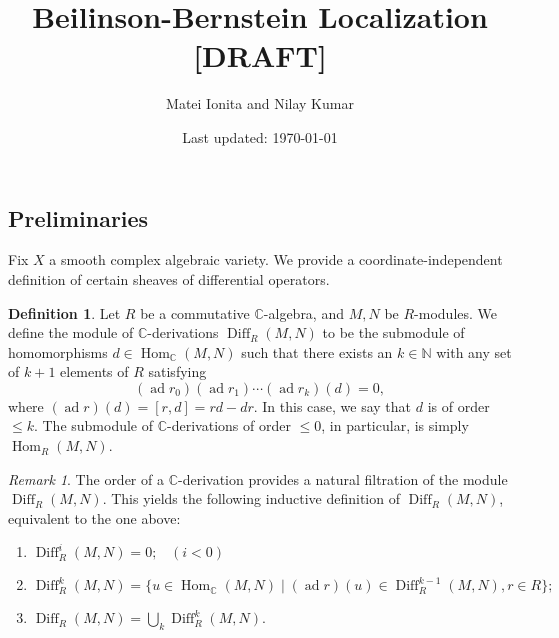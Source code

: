 \documentclass{article}
\newcommand{\C}{\mathbb{C}}
\newcommand{\N}{\mathbb{N}}
\theoremstyle{plain}
\theoremstyle{definition}
\newtheorem{definition}[theorem]{Definition}
\theoremstyle{remark}
\newtheorem*{remark}{Remark}
\DeclareMathOperator{\Hom}{Hom}
\DeclareMathOperator{\Diff}{Diff}
\DeclareMathOperator{\ad}{ad}
\begin{document}
\title{Beilinson-Bernstein Localization [DRAFT]}
\author{Matei Ionita and Nilay Kumar}
\date{Last updated: \today}

\maketitle

\subsection{Preliminaries}

Fix $X$ a smooth complex algebraic variety. We provide a coordinate-independent definition
of certain sheaves of differential operators.

\begin{definition}
    Let $R$ be a commutative $\C$-algebra, and $M,N$ be $R$-modules.
    We define the module of $\C$-derivations $\Diff_R(M,N)$ to be the submodule
    of homomorphisms $d\in\Hom_\C(M,N)$ such that there exists an $k\in\N$ with any set
    of $k+1$ elements of $R$ satisfying
    \[(\ad r_0)(\ad r_1)\cdots(\ad r_k)(d)=0,\]
    where $(\ad r)(d)=[r,d]=rd-dr$. In this case, we say that $d$ is of order $\leqslant k$.
    The submodule of $\C$-derivations of order $\leqslant 0$, in particular, is simply
    $\Hom_R(M,N)$.
    \label{def:derivations}
\end{definition}

\begin{remark}
    The order of a $\C$-derivation provides a natural filtration of the module $\Diff_R(M,N)$.
    This yields the following inductive definition of $\Diff_R(M,N)$, equivalent to the one
    above:
    \begin{enumerate}
        \item[] $\Diff^{i}_R(M,N) = 0; \;\;\;(i<0)$
        \item[] $\Diff^k_R(M,N) = \{u\in\Hom_\C(M,N)\mid (\ad r)(u)\in \Diff^{k-1}_R(M,N), r\in R\};$
        \item[] $\Diff_R(M,N)=\bigcup_k\Diff^k_R(M,N)$.
    \end{enumerate}
\end{remark}
\end{document}
